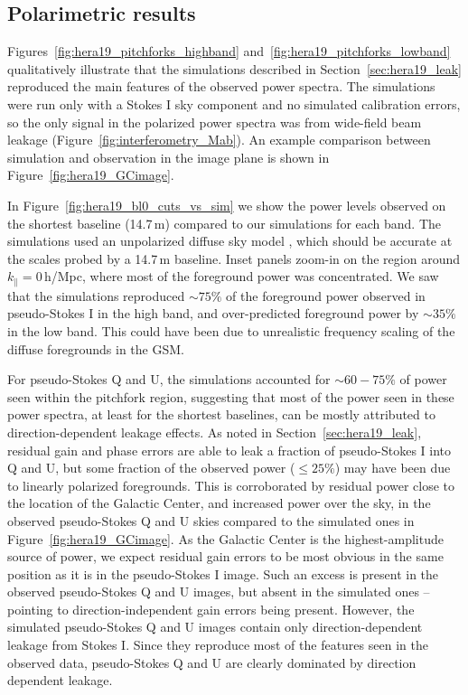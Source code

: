 \subsection{Polarimetric results}
\label{subsec:polarimetric_results}

Figures~\ref{fig:hera19_pitchforks_highband} and~\ref{fig:hera19_pitchforks_lowband} qualitatively illustrate that the simulations described in Section~\ref{sec:hera19_leak} reproduced the main features of the observed power spectra. The simulations were run only with a Stokes I sky component and no simulated calibration errors, so the only signal in the polarized power spectra was from wide-field beam leakage (Figure~\ref{fig:interferometry_Mab}). An example comparison between simulation and observation in the image plane is shown in Figure~\ref{fig:hera19_GCimage}.

In Figure~\ref{fig:hera19_bl0_cuts_vs_sim} we show the power levels observed on the shortest baseline (14.7\,m) compared to our simulations for each band. The simulations used an unpolarized diffuse sky model \citep[the most recent version of the GSM;][]{GSM.17}, which should be accurate at the scales probed by a 14.7\,m baseline. Inset panels zoom-in on the region around $k_{\parallel}=0$\,h/Mpc, where most of the foreground power was concentrated.
We saw that the simulations reproduced $\sim75\%$ of the foreground power observed in pseudo-Stokes I in the high band, and over-predicted foreground power by $\sim35\%$ in the low band. This could have been due to unrealistic frequency scaling of the diffuse foregrounds in the GSM. 

For pseudo-Stokes Q and U, the simulations accounted for $\sim 60-75\%$ of power seen within the pitchfork region, suggesting that most of the power seen in these power spectra, at least for the shortest baselines, can be mostly attributed to direction-dependent leakage effects. As noted in Section~\ref{sec:hera19_leak}, residual gain and phase errors are able to leak a fraction of pseudo-Stokes I into Q and U, but some fraction of the observed power ($\leqslant 25\%$) may have been due to linearly polarized foregrounds. This is corroborated by residual power close to the location of the Galactic Center, and increased power over the sky, in the observed pseudo-Stokes Q and U skies compared to the simulated ones in Figure~\ref{fig:hera19_GCimage}. As the Galactic Center is the highest-amplitude source of power, we expect residual gain errors to be most obvious in the same position as it is in the pseudo-Stokes I image. Such an excess is present in the observed pseudo-Stokes Q and U images, but absent in the simulated ones -- pointing to direction-independent gain errors being present. However, the simulated pseudo-Stokes Q and U images contain only direction-dependent leakage from Stokes I. Since they reproduce most of the features seen in the observed data, pseudo-Stokes Q and U are clearly dominated by direction dependent leakage.

